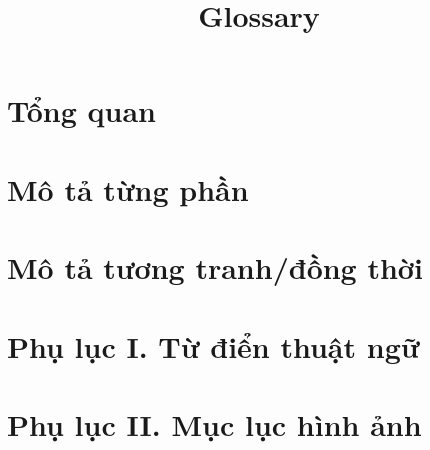 \documentclass[12pt, a4paper]{article}
\title{Glossary}
\begin{document}

\clearpage


\clearpage

\tableofcontents
\clearpage

\section{Tổng quan}


\section{Mô tả từng phần}


\section{Mô tả tương tranh/đồng thời}


\section{Phụ lục I. Từ điển thuật ngữ}


\section{Phụ lục II. Mục lục hình ảnh}




\end{document}
